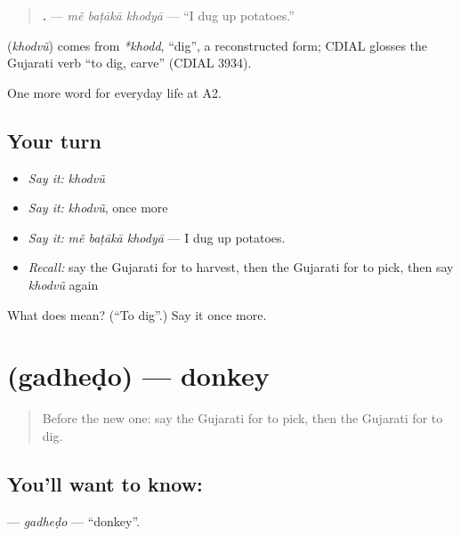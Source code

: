 \begin{quote}
\textbf{  .} — \emph{mẽ baṭākā khodyā} — \textquotedblleft{}I dug up potatoes.\textquotedblright{}
\end{quote}

\begin{cousinweb}
\textbf{} (\emph{khodvũ}) comes from \emph{*khodd}, \textquotedblleft{}dig\textquotedblright{}, a reconstructed form; CDIAL glosses the Gujarati verb \textquotedblleft{}to dig, carve\textquotedblright{} (CDIAL 3934).
\end{cousinweb}

\begin{grammarlens}[title={What you've built}]
One more word for everyday life at A2.
\end{grammarlens}

\subsection*{Your turn}
\begin{itemize}
\raggedright
  \item \emph{Say it:} \emph{khodvũ}
  \item \emph{Say it:} \emph{khodvũ}, once more
  \item \emph{Say it:} \emph{mẽ baṭākā khodyā} — I dug up potatoes.
  \item \emph{Recall:} say the Gujarati for to harvest, then the Gujarati for to pick, then say \emph{khodvũ} again
\end{itemize}

\begin{tcolorbox}[breakable,colback=teal!4,colframe=teal!35!black,title={Before you move on}]
What does  mean? (\textquotedblleft{}To dig\textquotedblright{}.) Say it once more.
\end{tcolorbox}
\section[\texorpdfstring{\gu{ગધેડો} (gadheḍo)}{ગધેડો (gadheḍo)}]{ (gadheḍo) — donkey}

\label{lesson:GU-C242-gadhedo}



\begin{quote}
Before the new one: say the Gujarati for to pick, then the Gujarati for to dig.
\end{quote}

\subsection*{You'll want to know: }
\textbf{} — \emph{gadheḍo} — \textquotedblleft{}donkey\textquotedblright{}.

